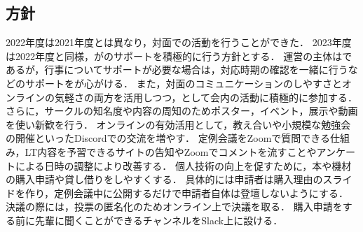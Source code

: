 \subsection*{\newGradeIfKouki{}\thirdGrade{}方針}


2022年度は2021年度とは異なり，対面での活動を行うことができた．
2023年度は2022年度と同様，\newGradeIfKouki{}\thirdGrade{}が\newGradeIfKouki{}\secondGrade{}のサポートを積極的に行う方針とする．
運営の主体は\newGradeIfKouki{}\secondGrade{}であるが，行事についてサポートが必要な場合は，対応時期の確認を一緒に行うなどのサポートを\newGradeIfKouki{}\thirdGrade{}が心がける．
また，対面のコミュニケーションのしやすさとオンラインの気軽さの両方を活用しつつ，\newGradeIfKouki{}\thirdGrade{}として会内の活動に積極的に参加する．
さらに，サークルの知名度や内容の周知のためポスター，イベント，展示や動画を使い新歓を行う．
オンラインの有効活用として，教え合いや小規模な勉強会の開催といったDiscordでの交流を増やす．
定例会議をZoomで質問できる仕組み，LT内容を予習できるサイトの告知やZoomでコメントを流すことやアンケートによる日時の調整により改善する．
個人技術の向上を促すために，本や機材の購入申請や貸し借りをしやすくする．
具体的には申請者は購入理由のスライドを作り，定例会議中に公開するだけで申請者自体は登壇しないようにする．
決議の際には，投票の匿名化のためオンライン上で決議を取る．
購入申請をする前に先輩に聞くことができるチャンネルをSlack上に設ける．
